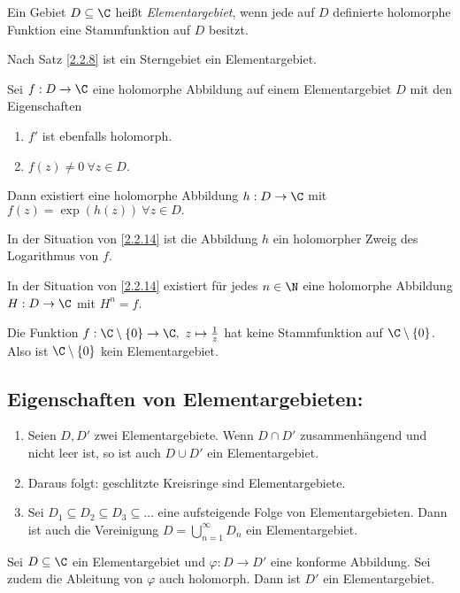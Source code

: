 \lecture
		\begin{defn}[Elementargebiet]
			Ein Gebiet $ D \subseteq \C $ heißt \emph{Elementargebiet}, wenn jede auf $D$ definierte holomorphe Funktion eine Stammfunktion auf $D$ besitzt.
		\end{defn}
		
		\begin{exmp}
			Nach Satz \ref{2.2.8} ist ein Sterngebiet ein Elementargebiet.
		\end{exmp}
		
		\begin{thm}\label{2.2.14}
			Sei $ f: D \to \C $ eine holomorphe Abbildung auf einem Elementargebiet $D$ mit den Eigenschaften
			\begin{enumerate}[label={\roman*})]
				\item $f'$ ist ebenfalls holomorph.
				\item $ f(z) \neq 0 \ \forall z \in D $.
			\end{enumerate}
			Dann existiert eine holomorphe Abbildung $ h: D \to \C $ mit $ f(z) = \exp(h(z)) \ \forall z \in D. $
		\end{thm}
		
		\begin{rem}
			In der Situation von \ref{2.2.14} ist die Abbildung $h$ ein holomorpher Zweig des Logarithmus von $f$.
		\end{rem}
		
		\begin{cor}
			In der Situation von \ref{2.2.14} existiert für jedes $ n \in \N $ eine holomorphe Abbildung $ H: D \to \C $ mit $ H^n = f $.
		\end{cor}
		
		\begin{exmp}
			Die Funktion $ f: \C \setminus\{0\} \to \C,\ z \mapsto \frac{1}{z} $ hat keine Stammfunktion auf $ \C \setminus\{0\} $. Also ist $ \C\setminus\{0\} $ kein Elementargebiet.
		\end{exmp}
		
		\subsection*{Eigenschaften von Elementargebieten:}
		\begin{enumerate}
			\item Seien $ D,D' $ zwei Elementargebiete. Wenn $ D \cap D' $ zusammenhängend und nicht leer ist, so ist auch $ D \cup D' $ ein Elementargebiet.
			\item Daraus folgt: geschlitzte Kreisringe sind Elementargebiete.
			\item Sei $ D_1 \subseteq D_2 \subseteq D_3 \subseteq \dots $ eine aufsteigende Folge von Elementargebieten. Dann ist auch die Vereinigung $ D = \bigcup_{n=1}^\infty D_n $ ein Elementargebiet.
		\end{enumerate}
		
		\begin{prop}
			Sei $ D \subseteq \C $ ein Elementargebiet und $ \varphi: D \to D' $ eine konforme Abbildung. Sei zudem die Ableitung von $\varphi$ auch holomorph. Dann ist $D'$ ein Elementargebiet.
		\end{prop}